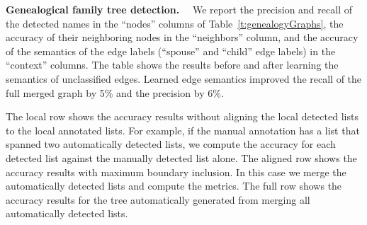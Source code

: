 \documentclass{llncs}
\begin{document}
\begin{table}[bt]                                     
\centering                                            
\caption{Results for Biblical genealogy family tree extraction. }
\normalsize                   
\label{t:genealogyGraphs} 
\end{table}    

{\bf Genealogical family tree detection.}~~ 
We report the precision and recall of the detected names in the ``nodes'' columns of Table~\ref{t:genealogyGraphs},
the accuracy of their neighboring nodes in the ``neighbors'' column, 
and the accuracy of the semantics of the edge labels (``spouse'' and ``child'' edge labels) 
in the ``context'' columns.
The table shows the results before and after learning the semantics of unclassified edges.
Learned edge semantics improved the recall of the full merged graph 
by 5\% and the precision by 6\%.

The local row shows the accuracy results without aligning the local detected lists to the local annotated lists. 
For example, if the manual annotation has a list that spanned two automatically detected lists, we compute the accuracy for each 
detected list against the manually detected list alone.
The aligned row shows the accuracy results with maximum boundary inclusion. In this case we merge the automatically detected lists
and compute the metrics.
The full row shows the accuracy results for the tree automatically generated from merging all automatically detected lists.
\end{document}
